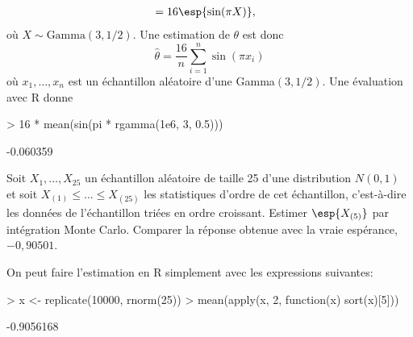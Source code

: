 \begin{exercice}
\begin{sol}
\begin{enumerate}
\begin{align*}
        &= 16 \esp{\sin (\pi X)},
      \end{align*}
      où $X \sim \text{Gamma}(3, 1/2)$. Une estimation de $\theta$ est
      donc
      \begin{displaymath}
        \hat{\theta} = \frac{16}{n} \sum_{i = 1}^n \sin(\pi x_i)
      \end{displaymath}
      où $x_1, \dots, x_n$ est un échantillon aléatoire d'une
      Gamma$(3, 1/2)$. Une évaluation avec \textsf{R} donne
\begin{Schunk}
\begin{Sinput}
> 16 * mean(sin(pi * rgamma(1e6, 3, 0.5)))
\end{Sinput}
\begin{Soutput}
[1] -0.060359
\end{Soutput}
\end{Schunk}
    \end{enumerate}
  \end{sol}
\end{exercice}

\begin{exercice}
  Soit $X_1, \dots, X_{25}$ un échantillon aléatoire de taille 25
  d'une distribution $N(0, 1)$ et soit $X_{(1)} \leq \dots \leq
  X_{(25)}$ les statistiques d'ordre de cet échantillon, c'est-à-dire
  les données de l'échantillon triées en ordre croissant. Estimer
  $\esp{X_{(5)}}$ par intégration Monte Carlo. Comparer la réponse
  obtenue avec la vraie espérance, $-0,90501$.
  \begin{sol}
    On peut faire l'estimation en \textsf{R} simplement avec les
    expressions suivantes:
\begin{Schunk}
\begin{Sinput}
> x <- replicate(10000, rnorm(25))
> mean(apply(x, 2, function(x) sort(x)[5]))
\end{Sinput}
\begin{Soutput}
[1] -0.9056168
\end{Soutput}
\end{Schunk}
  \end{sol}
\end{exercice}




